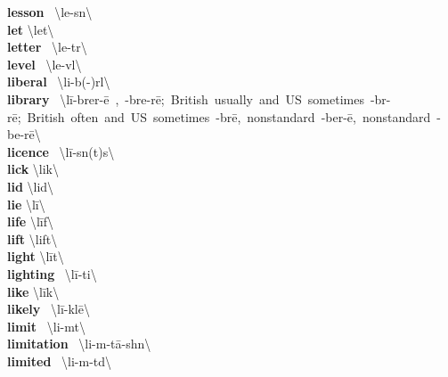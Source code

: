\documentclass[10pt,a4paper]{article}
\begin{document}
\begin{multicols}{2}
\textbf{ lesson }\quad \ \textbackslash \textprimstress le-s\textsuperscript{\textreve}n\textbackslash \\
\textbf{ let }\quad \textbackslash \textprimstress let\textbackslash \\
\textbf{ letter }\quad \ \textbackslash \textprimstress le-t\textschwa r\textbackslash \\
\textbf{ level }\quad \ \textbackslash \textprimstress le-v\textschwa l\textbackslash \\
\textbf{ liberal }\quad \ \textbackslash \textprimstress li-b(\textschwa -)r\textschwa l\textbackslash \\
\textbf{ library }\quad \ \textbackslash \textprimstress l\={i}-\textsecstress brer-\={e}\ ,\ -\textsecstress bre-r\={e};\ British\ usually\ and\ US\ sometimes\ -br\textschwa -r\={e};\ British\ often\ and\ US\ sometimes\ -br\={e},\ nonstandard\ -\textsecstress ber-\={e},\ nonstandard\ -\textsecstress be-r\={e}\textbackslash \\
\textbf{ licence }\quad \ \textbackslash \textprimstress l\={i}-s\textsuperscript{\textreve}n(t)s\textbackslash \\
\textbf{ lick }\quad \textbackslash \textprimstress lik\textbackslash \\
\textbf{ lid }\quad \textbackslash \textprimstress lid\textbackslash \\
\textbf{ lie }\quad \textbackslash \textprimstress l\={i}\textbackslash \\
\textbf{ life }\quad \textbackslash \textprimstress l\={i}f\textbackslash \\
\textbf{ lift }\quad \textbackslash \textprimstress lift\textbackslash \\
\textbf{ light }\quad \textbackslash \textprimstress l\={i}t\textbackslash \\
\textbf{ lighting }\quad \ \textbackslash \textprimstress l\={i}-ti\engma \textbackslash \\
\textbf{ like }\quad \textbackslash \textprimstress l\={i}k\textbackslash \\
\textbf{ likely }\quad \ \textbackslash \textprimstress l\={i}-kl\={e}\textbackslash \\
\textbf{ limit }\quad \ \textbackslash \textprimstress li-m\textschwa t\textbackslash \\
\textbf{ limitation }\quad \ \textbackslash \textsecstress li-m\textschwa -\textprimstress t\={a}-sh\textschwa n\textbackslash \\
\textbf{ limited }\quad \ \textbackslash \textprimstress li-m\textschwa -t\textschwa d\textbackslash \\

\end{multicols}
\end{document}
